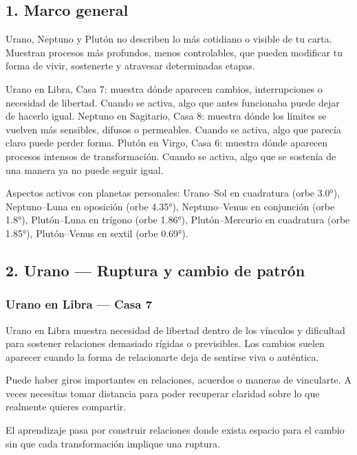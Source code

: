 \documentclass[11pt,a4paper]{article}
\begin{document}
\subsection{1. Marco general}

Urano, Neptuno y Plutón no describen lo más cotidiano o visible de tu carta. Muestran procesos más profundos, menos controlables, que pueden modificar tu forma de vivir, sostenerte y atravesar determinadas etapas.

Urano en Libra, Casa 7: muestra dónde aparecen cambios, interrupciones o necesidad de libertad. Cuando se activa, algo que antes funcionaba puede dejar de hacerlo igual.
Neptuno en Sagitario, Casa 8: muestra dónde los límites se vuelven más sensibles, difusos o permeables. Cuando se activa, algo que parecía claro puede perder forma.
Plutón en Virgo, Casa 6: muestra dónde aparecen procesos intensos de transformación. Cuando se activa, algo que se sostenía de una manera ya no puede seguir igual.

Aspectos activos con planetas personales: Urano–Sol en cuadratura (orbe 3.0°), Neptuno–Luna en oposición (orbe 4.35°), Neptuno–Venus en conjunción (orbe 1.8°), Plutón–Luna en trígono (orbe 1.86°), Plutón–Mercurio en cuadratura (orbe 1.85°), Plutón–Venus en sextil (orbe 0.69°).

\vspace{0.8cm}


\subsection{2. Urano — Ruptura y cambio de patrón}

\subsubsection*{Urano en Libra — Casa 7}

Urano en Libra muestra necesidad de libertad dentro de los vínculos y dificultad para sostener relaciones demasiado rígidas o previsibles. Los cambios suelen aparecer cuando la forma de relacionarte deja de sentirse viva o auténtica.

Puede haber giros importantes en relaciones, acuerdos o maneras de vincularte. A veces necesitas tomar distancia para poder recuperar claridad sobre lo que realmente quieres compartir.

El aprendizaje pasa por construir relaciones donde exista espacio para el cambio sin que cada transformación implique una ruptura.
\end{document}
